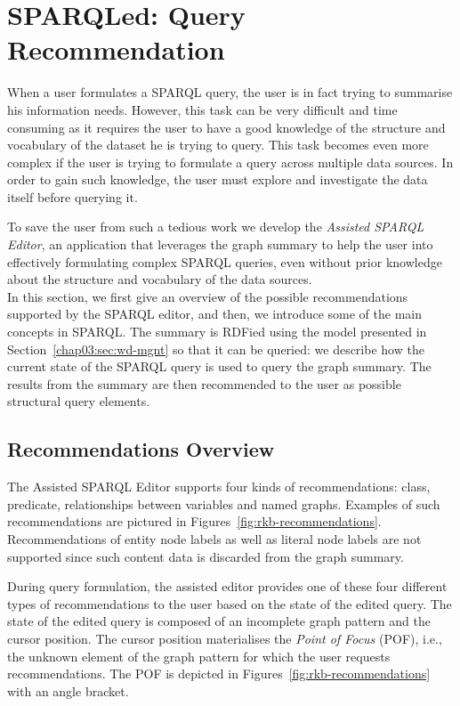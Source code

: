 \section{SPARQLed: Query Recommendation}
\label{sec:exploiting:sparqled:recommendation}

When a user formulates a SPARQL query, the user is in fact trying to summarise his information needs. However, this task can be very difficult and time consuming as it requires the user to have a good knowledge of the structure and vocabulary of the dataset he is trying to query. This task becomes even more complex if the user is trying to formulate a query across multiple data sources. In order to gain such knowledge, the user must explore and investigate the data itself before querying it.

To save the user from such a tedious work we develop the \emph{Assisted SPARQL Editor}, an application that leverages the graph summary to help the user into effectively formulating complex SPARQL queries, even without prior knowledge about the structure and vocabulary of the data sources.\\

In this section, we first give an overview of the possible recommendations supported by the SPARQL editor, and then, we introduce some of the main concepts in SPARQL. The summary is RDFied using the model presented in Section~\ref{chap03:sec:wd-mgnt} so that it can be queried: we describe how the current state of the SPARQL query is used to query the graph summary. The results from the summary are then recommended to the user as possible structural query elements.

\subsection{Recommendations Overview}

The Assisted SPARQL Editor supports four kinds of recommendations: class, predicate, relationships between variables and named graphs. Examples of such recommendations are pictured in Figures~\ref{fig:rkb-recommendations}. Recommendations of entity node labels as well as literal node labels are not supported since such content data is discarded from the graph summary.

During query formulation, the assisted editor provides one of these four different types of recommendations to the user based on the state of the edited query. The state of the edited query is composed of an incomplete graph pattern and the cursor position. The cursor position materialises the \emph{Point of Focus} (POF), i.e., the unknown element of the graph pattern for which the user requests recommendations. The POF is depicted in Figures~\ref{fig:rkb-recommendations} with an angle bracket.


